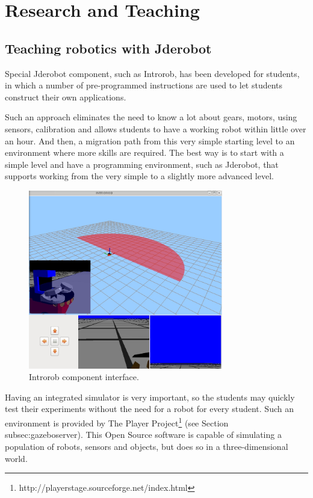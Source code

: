 \documentclass[twocolumn]{svjour3}          %
\begin{document}
\section{Research and Teaching}
\label{sec:applications}

\subsection{Teaching robotics with Jderobot}

Special Jderobot component, such as Introrob, has been developed for students, in which a number of pre-programmed instructions are used to let students construct their own applications.

Such an approach eliminates the need to know a lot about gears, motors, using sensors, calibration and allows students to have a working robot within little over an hour. And then, a migration path from this very simple starting level to an environment where more skills are required. The best way is to start with a simple level and have a programming environment, such as Jderobot, that supports working from the very simple to a slightly more advanced level.

\begin{figure}[h!]
  \includegraphics[width=8.5cm]{figs/introrob.jpg}
\caption{Introrob component interface.}
\label{fig:introrob}
\end{figure}

Having an integrated simulator is very important, so the students may quickly test their experiments without the need for a robot for every student. Such an environment is provided by The Player Project\footnote{http://playerstage.sourceforge.net/index.html} (see Section {subsec:gazeboserver}). This Open Source software is capable of simulating a population of robots, sensors and objects, but does so in a three-dimensional world.
\end{document}
